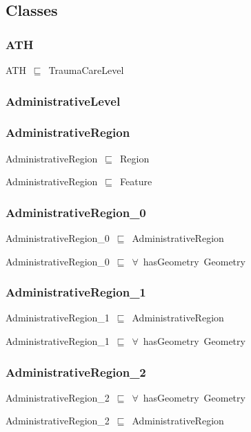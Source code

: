 \documentclass{article}
\begin{document}
\subsection*{Classes}

\subsubsection*{ATH}

ATH~\ensuremath{\sqsubseteq}~TraumaCareLevel~

\subsubsection*{AdministrativeLevel}

\subsubsection*{AdministrativeRegion}

AdministrativeRegion~\ensuremath{\sqsubseteq}~Region~

AdministrativeRegion~\ensuremath{\sqsubseteq}~Feature~

\subsubsection*{AdministrativeRegion\_0}

AdministrativeRegion\_0~\ensuremath{\sqsubseteq}~AdministrativeRegion~

AdministrativeRegion\_0~\ensuremath{\sqsubseteq}~\ensuremath{\forall}~hasGeometry~Geometry~

\subsubsection*{AdministrativeRegion\_1}

AdministrativeRegion\_1~\ensuremath{\sqsubseteq}~AdministrativeRegion~

AdministrativeRegion\_1~\ensuremath{\sqsubseteq}~\ensuremath{\forall}~hasGeometry~Geometry~

\subsubsection*{AdministrativeRegion\_2}

AdministrativeRegion\_2~\ensuremath{\sqsubseteq}~\ensuremath{\forall}~hasGeometry~Geometry~

AdministrativeRegion\_2~\ensuremath{\sqsubseteq}~AdministrativeRegion~
\end{document}
